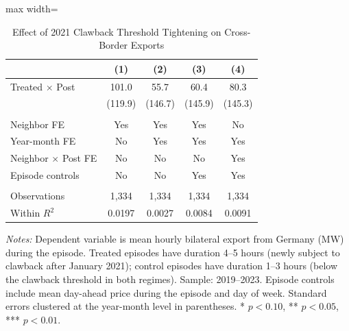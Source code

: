 \begin{table}[H]
\centering
\caption{Effect of 2021 Clawback Threshold Tightening on Cross-Border Exports}
\begin{threeparttable}
\begin{adjustbox}{max width=\textwidth}
\begin{tabular}{lcccc}
\toprule
& (1) & (2) & (3) & (4) \\
\midrule
Treated $\times$ Post & 101.0 & 55.7 & 60.4 & 80.3 \\
                       & (119.9) & (146.7) & (145.9) & (145.3) \\
\\
Neighbor FE & Yes & Yes & Yes & No \\
Year-month FE & No & Yes & Yes & Yes \\
Neighbor $\times$ Post FE & No & No & No & Yes \\
Episode controls & No & No & Yes & Yes \\
\\
Observations & 1,334 & 1,334 & 1,334 & 1,334 \\
Within $R^2$ & 0.0197 & 0.0027 & 0.0084 & 0.0091 \\
\bottomrule
\end{tabular}
\end{adjustbox}
\begin{tablenotes}[flushleft]
\small
\item \textit{Notes:} Dependent variable is mean hourly bilateral export from Germany (MW) during the episode. Treated episodes have duration 4--5 hours (newly subject to clawback after January 2021); control episodes have duration 1--3 hours (below the clawback threshold in both regimes). Sample: 2019--2023. Episode controls include mean day-ahead price during the episode and day of week. Standard errors clustered at the year-month level in parentheses. * $p<0.10$, ** $p<0.05$, *** $p<0.01$.
\end{tablenotes}
\end{threeparttable}
\label{tab:main2021}
\end{table}
